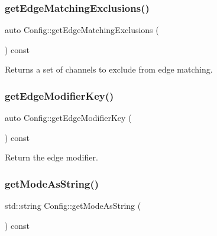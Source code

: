 \mbox{\label{class_config_a52e4f9cf94eb242fd536a6cde42088a8}} 
\subsubsection{\texorpdfstring{get\+Edge\+Matching\+Exclusions()}{getEdgeMatchingExclusions()}}
{\footnotesize\ttfamily auto Config\+::get\+Edge\+Matching\+Exclusions (\begin{DoxyParamCaption}{ }\end{DoxyParamCaption}) const\hspace{0.3cm}{\ttfamily [inline]}}



Returns a set of channels to exclude from edge matching. 

\mbox{\label{class_config_a6e86864ba8e73310866654a53bd46170}} 
\subsubsection{\texorpdfstring{get\+Edge\+Modifier\+Key()}{getEdgeModifierKey()}}
{\footnotesize\ttfamily auto Config\+::get\+Edge\+Modifier\+Key (\begin{DoxyParamCaption}{ }\end{DoxyParamCaption}) const\hspace{0.3cm}{\ttfamily [inline]}}



Return the edge modifier. 

\mbox{\label{class_config_a3bd48a0ae54bfd982c02564160d6762b}} 
\subsubsection{\texorpdfstring{get\+Mode\+As\+String()}{getModeAsString()}}
{\footnotesize\ttfamily std\+::string Config\+::get\+Mode\+As\+String (\begin{DoxyParamCaption}{ }\end{DoxyParamCaption}) const\hspace{0.3cm}{\ttfamily [private]}}




